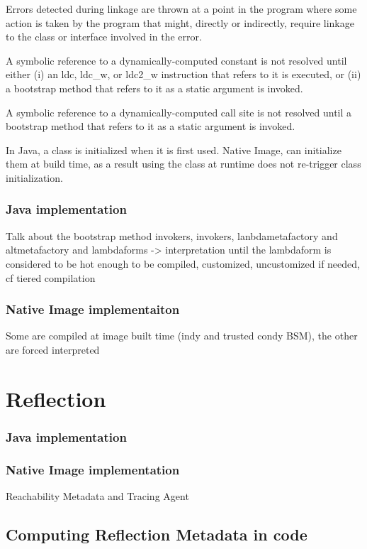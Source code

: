     Errors detected during linkage are thrown at a point in the program where some action is taken by the program that might, directly or indirectly, require linkage to the class or interface involved in the error.

    A symbolic reference to a dynamically-computed constant is not resolved until either (i) an ldc, ldc_w, or ldc2_w instruction that refers to it is executed, or (ii) a bootstrap method that refers to it as a static argument is invoked.

    A symbolic reference to a dynamically-computed call site is not resolved until a bootstrap method that refers to it as a static argument is invoked.

In Java, a class is initialized when it is first used. Native Image, can initialize them at build time, as a result using the class at runtime does not re-trigger class initialization.


\subsubsection{Java implementation}
Talk about the bootstrap method invokers, invokers, lanbdametafactory and altmetafactory and lambdaforms -> interpretation until the lambdaform is
considered to be hot enough to be compiled, customized, uncustomized if needed, cf tiered compilation
\subsubsection{Native Image implementaiton}
Some are compiled at image built time (indy and trusted condy BSM), the other are forced interpreted


\section{Reflection}

\subsubsection{Java implementation}

\subsubsection{Native Image implementation}
Reachability Metadata and Tracing Agent

 \subsection{Computing Reflection Metadata in code}

